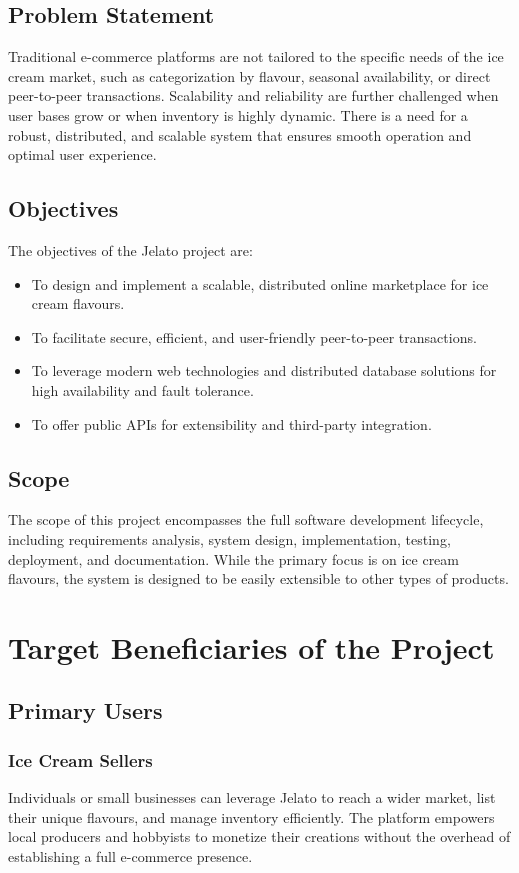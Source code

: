 \documentclass[12pt,a4paper]{report}
\begin{document}
\section{Problem Statement}
Traditional e-commerce platforms are not tailored to the specific needs of the ice cream market, such as categorization by flavour, seasonal availability, or direct peer-to-peer transactions. Scalability and reliability are further challenged when user bases grow or when inventory is highly dynamic. There is a need for a robust, distributed, and scalable system that ensures smooth operation and optimal user experience.

\section{Objectives}
The objectives of the Jelato project are:
\begin{itemize}
    \item To design and implement a scalable, distributed online marketplace for ice cream flavours.
    \item To facilitate secure, efficient, and user-friendly peer-to-peer transactions.
    \item To leverage modern web technologies and distributed database solutions for high availability and fault tolerance.
    \item To offer public APIs for extensibility and third-party integration.
\end{itemize}

\section{Scope}
The scope of this project encompasses the full software development lifecycle, including requirements analysis, system design, implementation, testing, deployment, and documentation. While the primary focus is on ice cream flavours, the system is designed to be easily extensible to other types of products.

\chapter{Target Beneficiaries of the Project}
\section{Primary Users}
\subsection*{Ice Cream Sellers}
Individuals or small businesses can leverage Jelato to reach a wider market, list their unique flavours, and manage inventory efficiently. The platform empowers local producers and hobbyists to monetize their creations without the overhead of establishing a full e-commerce presence.
\end{document}

